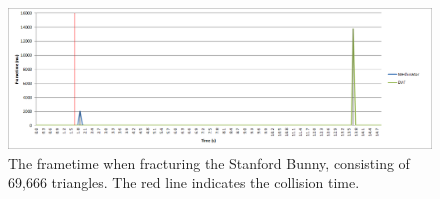 \FloatBarrier

\FloatBarrier

\begin{figure}
\centerline{\includegraphics[scale=0.7]{../Logs/single_bunny_frametime.png}}
\caption{The frametime when fracturing the Stanford Bunny, consisting of 69,666 triangles. The red line indicates the collision time.}
\label{fig:4.24.1}
\end{figure}

